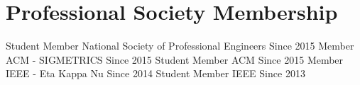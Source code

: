 \section{Professional Society Membership}
\begin{cvhonors}
  \cvhonor
    {Student Member}
    {National Society of Professional Engineers}
    {}
    {Since 2015}
  \cvhonor
    {Member}
    {ACM - SIGMETRICS}
    {}
    {Since 2015}
  \cvhonor
    {Student Member}
    {ACM}
    {}
    {Since 2015}
  \cvhonor
    {Member}
    {IEEE - Eta Kappa Nu}
    {}
    {Since 2014}
  \cvhonor
    {Student Member}
    {IEEE}
    {}
    {Since 2013}
\end{cvhonors} 